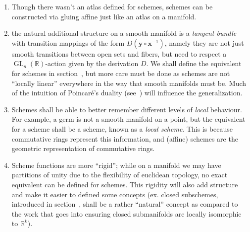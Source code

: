 \documentclass{article}
\newcommand{\R}{{\mathbb{R}}}
\newcommand{\GL}{{\operatorname{GL}}}
\begin{document}
\begin{enumerate}
	\item Though there wasn't an atlas defined for schemes, schemes can be constructed via gluing affine just like an atlas on a manifold.
	\item the natural additional structure on a smooth manifold is a \emph{tangent bundle} with transition
		mappings of the form $D(\textbf{y}\circ\textbf{x}^{-1})$, namely they are not just smooth transitions
		between open sets and fibers, but need to respect a $\GL_n(\R)$-action given by the derivation $D$.
		We shall define the equivalent for schemes in section~\cite[Differentials]{NateAlgGeo}, but more care must be done as schemes are not ``locally linear''
		everywhere in the way that smooth manifolds must be. Much of the intuition of Poincar\'e's duality
		(see~\cite[section~4.3]{NateAlgTop}) will influence the generalization.
	\item Schemes shall be able to better remember different levels of \emph{local} behaviour. For example,
		a germ is not a smooth manifold on a point, but the equivalent for a scheme shall be a scheme, known
		as a \emph{local scheme}. This is because commutative rings represent this information, and (affine)
		schemes are the geometric representation of commutative rings.
	\item Scheme functions are more ``rigid''; while on a manifold we may have partitions of unity due to the
		flexibility of euclidean topology, no exact equivalent can be defined for schemes.  This rigidity
		will also add structure and make it easier to defined some concepts (ex. closed subschemes, introduced
		in section~\cite[Open and Closed Subschemes]{NateAlgGeo}, shall be a rather ``natural'' concept as compared to the work
		that goes into ensuring closed submanifolds are locally isomorphic to $\R^k$).


\end{enumerate}
\end{document}
